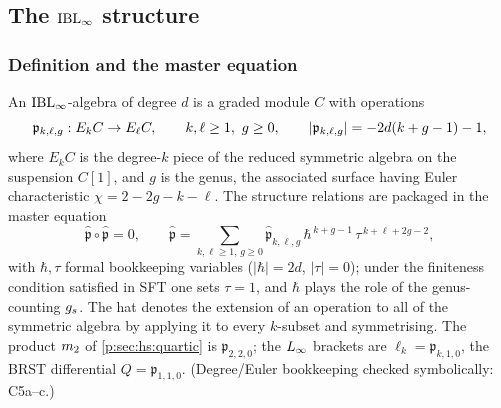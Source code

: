 \subsection{The \texorpdfstring{$\mathrm{IBL}_\infty$}{IBL-infinity} structure}
\label{ov:sec:IBL}

\subsubsection{Definition and the master equation}

An $\mathrm{IBL}_\infty$-algebra \cite{Cieliebak:2015:HomologicalAlgebraRelated} of degree $d$ is a graded module $C$ with operations
\begin{equation}
	\mathfrak{p}_{k,\ell,g} : E_kC \to E_\ell C,\qquad k,\ell\ge1,\ g\ge0,\qquad
	|\mathfrak{p}_{k,\ell,g}| = -2d(k+g-1)-1,
	\label{ov:eq:IBLdeg}
\end{equation}
where $E_kC$ is the degree-$k$ piece of the reduced symmetric algebra on the suspension $C[1]$,
and $g$ is the genus, the associated surface having Euler characteristic $\chi=2-2g-k-\ell$.
The structure relations are packaged in the master equation
\begin{equation}
	\boxed{\;\hat{\mathfrak{p}}\circ\hat{\mathfrak{p}}=0,\qquad
	\hat{\mathfrak{p}}=\sum_{k,\ell\ge1,\,g\ge0}
	\hat{\mathfrak{p}}_{k,\ell,g}\,\hbar^{\,k+g-1}\,\tau^{\,k+\ell+2g-2},\;}
	\label{ov:eq:IBLmaster}
\end{equation}
with $\hbar,\tau$ formal bookkeeping variables ($|\hbar|=2d$, $|\tau|=0$); under the
finiteness condition satisfied in SFT one sets $\tau=1$, and $\hbar$ plays the role of the
genus-counting $g_s$. The hat denotes the extension of an operation to all of the symmetric
algebra by applying it to every $k$-subset and symmetrising. The product $m_2$ of
\cref{p:sec:hs:quartic} is $\mathfrak{p}_{2,2,0}$; the $L_\infty$ brackets are
$\ell_k=\mathfrak{p}_{k,1,0}$, the BRST differential $Q=\mathfrak{p}_{1,1,0}$.
(Degree/Euler bookkeeping checked symbolically: C5a--c.)

